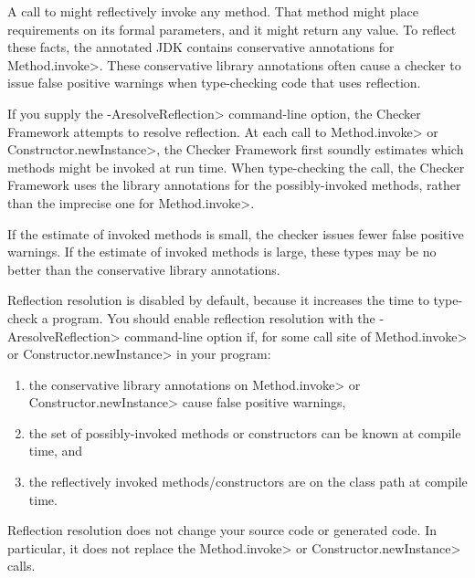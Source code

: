 \htmlhr

\def\reflectionAnno#1#2{\refqualclass{common/reflection/qual}{#1}\code{#2}}



A call to
might reflectively invoke any method.  That method might place requirements
on its formal parameters, and it might return any value.  To reflect these
facts, the annotated JDK contains
conservative annotations for \<Method.invoke>.
These conservative library annotations often cause a checker to issue false
positive warnings when type-checking code that uses reflection.

If you supply the \<-AresolveReflection> command-line option, the Checker
Framework attempts to resolve reflection.  At each call to \<Method.invoke>
or \<Constructor.newInstance>, the Checker Framework first soundly estimates
which methods might be invoked at run time.  When type-checking the call, the
Checker Framework uses the library annotations for the possibly-invoked
methods, rather than the imprecise one for \<Method.invoke>.

If the estimate of invoked methods is small,
the checker issues fewer false positive warnings.
If the estimate of invoked methods is large, these types may be no better than the
conservative library annotations.

Reflection resolution is disabled by default, because it increases the time
to type-check a program.
You should enable reflection resolution with the \<-AresolveReflection>
command-line option if, for some call site of \<Method.invoke> or
\<Constructor.newInstance> in your program:
\begin{enumerate}
\item
  the conservative library annotations on \<Method.invoke> or
  \<Constructor.newInstance> cause false positive warnings,
\item
  the set of possibly-invoked methods or constructors can be known at
  compile time,
  and
\item
  the reflectively invoked methods/constructors are on the class path at
  compile time.
\end{enumerate}

Reflection resolution does not change your source code or generated code.
In particular, it does not replace the \<Method.invoke> or
\<Constructor.newInstance> calls.

